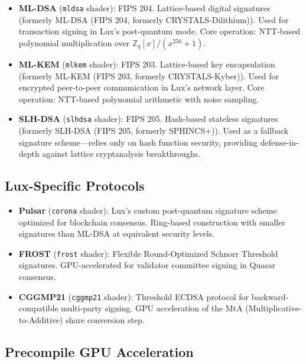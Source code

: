 \begin{itemize}
\item \textbf{ML-DSA} (\texttt{mldsa} shader): FIPS 204. Lattice-based digital signatures
      (formerly ML-DSA (FIPS 204, formerly CRYSTALS-Dilithium)). Used for transaction signing in Lux's post-quantum mode.
      Core operation: NTT-based polynomial multiplication over $\mathbb{Z}_q[x]/(x^{256}+1)$.

\item \textbf{ML-KEM} (\texttt{mlkem} shader): FIPS 203. Lattice-based key encapsulation
      (formerly ML-KEM (FIPS 203, formerly CRYSTALS-Kyber)). Used for encrypted peer-to-peer communication in Lux's
      network layer. Core operation: NTT-based polynomial arithmetic with noise sampling.

\item \textbf{SLH-DSA} (\texttt{slhdsa} shader): FIPS 205. Hash-based stateless signatures
      (formerly SLH-DSA (FIPS 205, formerly SPHINCS+)). Used as a fallback signature scheme---relies only on hash function
      security, providing defense-in-depth against lattice cryptanalysis breakthroughs.
\end{itemize}

\subsection{Lux-Specific Protocols}

\begin{itemize}
\item \textbf{Pulsar} (\texttt{corona} shader): Lux's custom post-quantum signature
      scheme optimized for blockchain consensus. Ring-based construction with smaller
      signatures than ML-DSA at equivalent security levels.

\item \textbf{FROST} (\texttt{frost} shader): Flexible Round-Optimized Schnorr Threshold
      signatures. GPU-accelerated for validator committee signing in Quasar consensus.

\item \textbf{CGGMP21} (\texttt{cggmp21} shader): Threshold ECDSA protocol for
      backward-compatible multi-party signing. GPU acceleration of the MtA
      (Multiplicative-to-Additive) share conversion step.
\end{itemize}

\subsection{Precompile GPU Acceleration}

